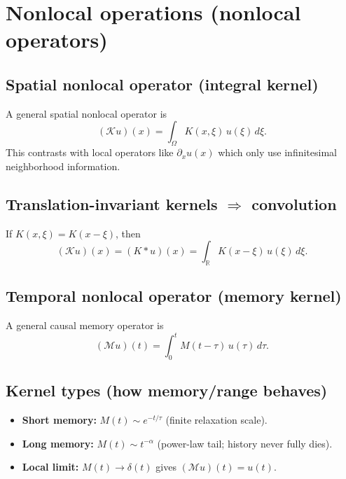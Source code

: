 
\section{Nonlocal operations (nonlocal operators)}

\subsection{Spatial nonlocal operator (integral kernel)}
A general spatial nonlocal operator is
\begin{equation}
(\mathcal{K}u)(x)=\int_{\Omega}K(x,\xi)\,u(\xi)\,d\xi.
\end{equation}
This contrasts with local operators like $\partial_x u(x)$ which only use infinitesimal neighborhood information.

\subsection{Translation-invariant kernels $\Rightarrow$ convolution}
If $K(x,\xi)=K(x-\xi)$, then
\begin{equation}
(\mathcal{K}u)(x)=(K*u)(x)=\int_{\mathbb{R}}K(x-\xi)\,u(\xi)\,d\xi.
\end{equation}

\subsection{Temporal nonlocal operator (memory kernel)}
A general causal memory operator is
\begin{equation}
(\mathcal{M}u)(t)=\int_0^t M(t-\tau)\,u(\tau)\,d\tau.
\end{equation}

\subsection{Kernel types (how memory/range behaves)}
\begin{itemize}
\item \textbf{Short memory:} $M(t)\sim e^{-t/\tau}$ (finite relaxation scale).
\item \textbf{Long memory:} $M(t)\sim t^{-\alpha}$ (power-law tail; history never fully dies).
\item \textbf{Local limit:} $M(t)\to \delta(t)$ gives $(\mathcal{M}u)(t)=u(t)$.
\end{itemize}

